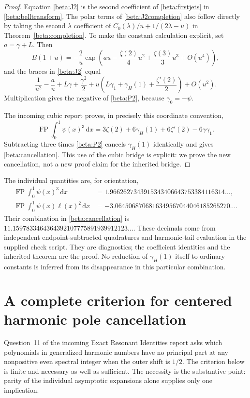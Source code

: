 \documentclass[11pt]{article}
\numberwithin{equation}{section}
\theoremstyle{definition}
\theoremstyle{remark}
\DeclareMathOperator{\FP}{FP}
\newcommand{\dd}{\,\mathrm d}
\begin{document}
\begin{proof}
Equation \eqref{beta:J2} is the second coefficient of
\eqref{beta:firstjets} in \eqref{beta:belltransform}.
The polar terms of \eqref{beta:J2completion} also follow directly
by taking the second $\lambda$ coefficient of
$C_0(\lambda)/u+1/(2\lambda-u)$ in
Theorem~\ref{beta:completion}. To make the constant calculation
explicit, set $a=\gamma+L$. Then
\[
 B(1+u)=-\frac2u
 \exp\left(au-\frac{\zeta(2)}4u^2+\frac{\zeta(3)}3u^3+O(u^4)\right),
\]
and the braces in \eqref{beta:J2} equal
\[
 \frac1{u^2}-\frac a u+L\gamma+\frac{\gamma^2}2
  +u\left(L\gamma_1+\gamma_H(1)+\frac{\zeta'(2)}2\right)+O(u^2).
\]
Multiplication gives the negative of \eqref{beta:P2}, because
$\gamma_0=-\psi$.

The incoming cubic report \cite{RepoCubic} proves, in precisely this
coordinate convention,
\begin{equation}\label{beta:inheritedcube}
 \FP\int_0^1\psi(x)^3\dd x
 =3\zeta(2)+6\gamma_H(1)+6\zeta'(2)-6\gamma\gamma_1.
\end{equation}
Subtracting three times \eqref{beta:P2} cancels $\gamma_H(1)$
identically and gives \eqref{beta:cancellation}. This use of the cubic
bridge is explicit: we prove the new cancellation, not a new proof
claim for the inherited bridge.
\end{proof}

The individual quantities are, for orientation,
\begin{align*}
 \FP\int_0^1\psi(x)^3\dd x
   &=1.9662627343915343406643753384116314\ldots,\\
 \FP\int_0^1\psi(x)\ell(x)^2\dd x
   &=-3.0645068706816349567044046185265270\ldots.
\end{align*}
Their combination in \eqref{beta:cancellation} is
$11.1597833464364392107775891939912123\ldots$.
These decimals come from independent endpoint-subtracted quadratures
and harmonic-tail evaluation in the supplied check script. They are
diagnostics; the coefficient identities and the inherited theorem are
the proof. No reduction of $\gamma_H(1)$ itself to ordinary constants
is inferred from its disappearance in this particular combination.


\section{A complete criterion for centered harmonic pole cancellation}
\label{hc:section}

Question~11 of the incoming Exact Resonant Identities report \cite{RepoExact} asks which
polynomials in generalized harmonic numbers have no principal part at
any nonpositive even spectral integer when the outer shift is $1/2$.
The criterion below is finite and necessary as well as sufficient.
The necessity is the substantive point: parity of the individual
asymptotic expansions alone supplies only one implication.
\end{document}
